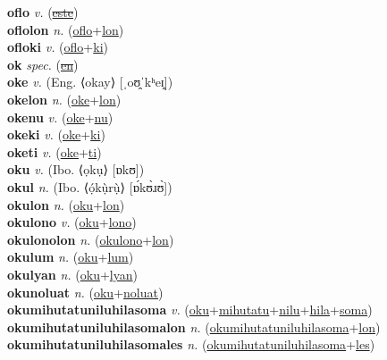 \textbf{oflo} \textit{v.} (\hyperref[este]{\sout{este}})
 \label{oflo} \\
\textbf{oflolon} \textit{n.} (\hyperref[oflo]{oflo}+\hyperref[lon]{lon})
 \label{oflolon} \\
\textbf{ofloki} \textit{v.} (\hyperref[oflo]{oflo}+\hyperref[ki]{ki})
 \label{ofloki} \\
\textbf{ok} \textit{spec.} (\hyperref[en]{\sout{en}})
 \label{ok} \\
\textbf{oke} \textit{v.} (Eng. ⟨okay⟩ [ˌoʊ̯ˈkʰeɪ̯])
 \label{oke} \\
\textbf{okelon} \textit{n.} (\hyperref[oke]{oke}+\hyperref[lon]{lon})
 \label{okelon} \\
\textbf{okenu} \textit{v.} (\hyperref[oke]{oke}+\hyperref[nu]{nu})
 \label{okenu} \\
\textbf{okeki} \textit{v.} (\hyperref[oke]{oke}+\hyperref[ki]{ki})
 \label{okeki} \\
\textbf{oketi} \textit{v.} (\hyperref[oke]{oke}+\hyperref[ti]{ti})
 \label{oketi} \\
\textbf{oku} \textit{v.} (Ibo. ⟨ọkụ⟩ [ɒkʊ])
 \label{oku} \\
\textbf{okul} \textit{n.} (Ibo. ⟨ọ́kụ̀rụ̀⟩ [ɒ́kʊ̀ɹʊ̀])
 \label{okul} \\
\textbf{okulon} \textit{n.} (\hyperref[oku]{oku}+\hyperref[lon]{lon})
 \label{okulon} \\
\textbf{okulono} \textit{v.} (\hyperref[oku]{oku}+\hyperref[lono]{lono})
 \label{okulono} \\
\textbf{okulonolon} \textit{n.} (\hyperref[okulono]{okulono}+\hyperref[lon]{lon})
 \label{okulonolon} \\
\textbf{okulum} \textit{n.} (\hyperref[oku]{oku}+\hyperref[lum]{lum})
 \label{okulum} \\
\textbf{okulyan} \textit{n.} (\hyperref[oku]{oku}+\hyperref[lyan]{lyan})
 \label{okulyan} \\
\textbf{okunoluat} \textit{n.} (\hyperref[oku]{oku}+\hyperref[noluat]{noluat})
 \label{okunoluat} \\
\textbf{okumihutatuniluhilasoma} \textit{v.} (\hyperref[oku]{oku}+\hyperref[mihutatu]{mihutatu}+\hyperref[nilu]{nilu}+\hyperref[hila]{hila}+\hyperref[soma]{soma})
 \label{okumihutatuniluhilasoma} \\
\textbf{okumihutatuniluhilasomalon} \textit{n.} (\hyperref[okumihutatuniluhilasoma]{okumihutatuniluhilasoma}+\hyperref[lon]{lon})
 \label{okumihutatuniluhilasomalon} \\
\textbf{okumihutatuniluhilasomales} \textit{n.} (\hyperref[okumihutatuniluhilasoma]{okumihutatuniluhilasoma}+\hyperref[les]{les})
